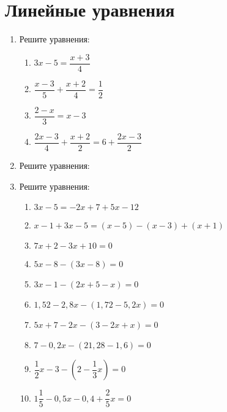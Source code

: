 \documentclass[10pt, a4paper]{article}
\begin{document}
		
 

\section{Линейные уравнения}
\begin{enumerate}
	\item Решите уравнения:
	\begin{multicols}{2}
		\begin{enumerate}[label=\asbuk*)]
			\item $3x-5=\dfrac{x+3}{4}$
			\item $\dfrac{x-3}{5}+\dfrac{x+2}{4}=\dfrac{1}{2}$
			\item $\dfrac{2-x}{3}=x-3$
			\item $\dfrac{2x-3}{4}+\dfrac{x+2}{2}=6+\dfrac{2x-3}{2}$
		\end{enumerate}
	\end{multicols}
	\item Решите уравнения:
	\begin{enumerate}[label=\asbuk*)]
	\end{enumerate}
	\item Решите уравнения:
	\begin{enumerate}[label=\asbuk*)]
		\item $3x-5=-2x+7+5x-12$
		\item $x-1+3x-5=(x-5)-(x-3)+(x+1)$
		\item $7x+2-3x+10=0$
		\item $5x-8-(3x-8)=0$
		\item $3x-1-(2x+5-x)=0$
		\item $1,52-2,8x-(1,72-5,2x)=0$
		\item $5x+7-2x-(3-2x+x)=0$
		\item $7-0,2x-(21,28-1,6)=0$
		\item $\dfrac{1}{2}x-3-\left(2-\dfrac{1}{3}x\right)=0$
		\item $1\dfrac{1}{5}-0,5x-0,4+\dfrac{2}{5}x=0$

\end{enumerate}
\end{enumerate}
\end{document}
